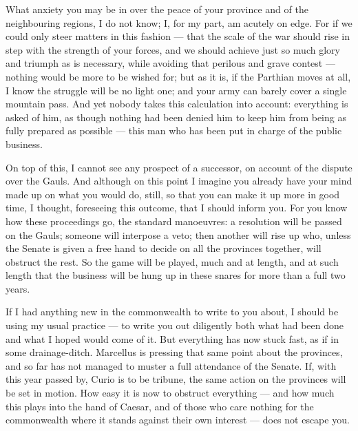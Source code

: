

 What anxiety you may be in over the peace of your province and of the neighbouring regions, I do not know; I, for my part, am acutely on edge. For if we could only steer matters in this fashion --- that the scale of the war should rise in step with the strength of your forces, and we should achieve just so much glory and triumph as is necessary, while avoiding that perilous and grave contest --- nothing would be more to be wished for; but as it is, if the Parthian moves at all, I know the struggle will be no light one; and your army can barely cover a single mountain pass. And yet nobody takes this calculation into account: everything is asked of him, as though nothing had been denied him to keep him from being as fully prepared as possible --- this man who has been put in charge of the public business.

 On top of this, I cannot see any prospect of a successor, on account of the dispute over the Gauls. And although on this point I imagine you already have your mind made up on what you would do, still, so that you can make it up more in good time, I thought, foreseeing this outcome, that I should inform you. For you know how these proceedings go, the standard manoeuvres: a resolution will be passed on the Gauls; someone will interpose a veto; then another will rise up who, unless the Senate is given a free hand to decide on all the provinces together, will obstruct the rest. So the game will be played, much and at length, and at such length that the business will be hung up in these snares for more than a full two years.

 If I had anything new in the commonwealth to write to you about, I should be using my usual practice --- to write you out diligently both what had been done and what I hoped would come of it. But everything has now stuck fast, as if in some drainage-ditch. Marcellus is pressing that same point about the provinces, and so far has not managed to muster a full attendance of the Senate. If, with this year passed by, Curio is to be tribune, the same action on the provinces will be set in motion. How easy it is now to obstruct everything --- and how much this \textdagger plays into the hand of Caesar\textdagger, and of those who care nothing for the commonwealth where it stands against their own interest --- does not escape you.
